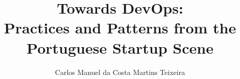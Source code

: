\documentclass[11pt,a4paper,twoside,openright]{report}
\begin{document}
	\title{Towards DevOps: \\ Practices and Patterns from the Portuguese Startup Scene }
	\author{Carlos Manuel da Costa Martins Teixeira}

\begin{Prolog}
  \tableofcontents
\end{Prolog}


\StartBody




%  
%  
%  
  
%  
%  

\end{document}
